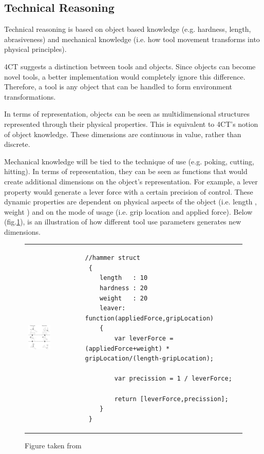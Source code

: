 \documentclass[11]{article}
\begin{document}
\subsection{Technical Reasoning}

Technical reasoning is based on object based knowledge (e.g. hardness, length, abrasiveness) and mechanical knowledge (i.e. how tool movement transforms into physical principles)\cite{osiurak2014}.

4CT suggests a distinction between tools and objects.  Since objects can become novel tools, a better implementation would completely ignore this difference. Therefore, a tool is any object that can be handled to form environment transformations. 

In terms of representation, objects can be seen as multidimensional structures represented through their physical properties. This is equivalent to 4CT's notion of object knowledge. These dimensions are continuous in value, rather than discrete. 

Mechanical knowledge will be tied to the technique of use (e.g. poking, cutting, hitting). In terms of representation, they can be seen as functions that would create additional dimensions on the object's representation. For example, a lever property would generate a lever force with a certain precision of control. These dynamic properties are dependent on physical aspects of the object (i.e. length , weight ) and on the mode of usage (i.e. grip location and applied force). Below (fig.\ref{fig:hammer}), is an illustration of how different tool use parameters generates new dimensions. 
\begin{figure}[h]
\centering
\begin{tabular}{p{} p{}}
  \vspace{0pt} \includegraphics[width=0.45\textwidth]{hammering.png} &
  \vspace{0pt} \begin{lstlisting}
//hammer struct
 { 
	length   : 10
	hardness : 20 
	weight   : 20 
	leaver: function(appliedForce,gripLocation)
	{
		var leverForce = (appliedForce+weight) *  gripLocation/(length-gripLocation);
		
		var precission = 1 / leverForce;

		return [leverForce,precission];
	}
 }
  \end{lstlisting}
\end{tabular}
  
      \caption{  
   Figure taken from \cite{osiurak2014}
   }
   \label{fig:hammer}

\end{figure}
\end{document}
